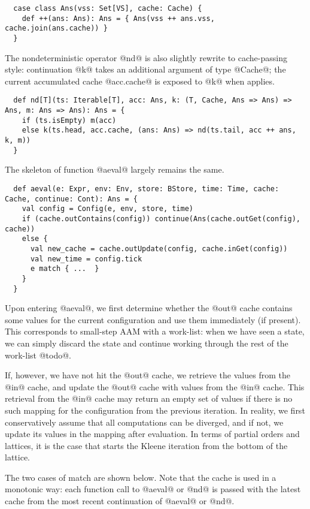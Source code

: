\documentclass[acmsmall, review]{acmart}\settopmatter{}
\begin{document}
\begin{lstlisting}
  case class Ans(vss: Set[VS], cache: Cache) {
    def ++(ans: Ans): Ans = { Ans(vss ++ ans.vss, cache.join(ans.cache)) }
  }
\end{lstlisting}

The nondeterministic operator @nd@ is also slightly rewrite to cache-passing style:
continuation @k@ takes an additional argument of type @Cache@; the current accumulated
cache @acc.cache@ is exposed to @k@ when applies.

\begin{lstlisting}
  def nd[T](ts: Iterable[T], acc: Ans, k: (T, Cache, Ans => Ans) => Ans, m: Ans => Ans): Ans = {
    if (ts.isEmpty) m(acc)
    else k(ts.head, acc.cache, (ans: Ans) => nd(ts.tail, acc ++ ans, k, m))
  }
\end{lstlisting}

The skeleton of function @aeval@ largely remains the same. 

\begin{lstlisting}
  def aeval(e: Expr, env: Env, store: BStore, time: Time, cache: Cache, continue: Cont): Ans = {
    val config = Config(e, env, store, time)
    if (cache.outContains(config)) continue(Ans(cache.outGet(config), cache))
    else {
      val new_cache = cache.outUpdate(config, cache.inGet(config))
      val new_time = config.tick 
      e match { ...  }
    }
  }
\end{lstlisting}

Upon entering @aeval@, we first determine whether the @out@ cache
contains some values for the current configuration and use them immediately (if present).
This corresponds to small-step AAM with a work-list: when we have seen a state,
we can simply discard the state and continue working through the rest of the work-list @todo@.

If, however, we have not hit the @out@ cache, we retrieve the values from the @in@ cache, 
and update the @out@ cache with values from the @in@ cache. This retrieval from the @in@ 
cache may return an empty set of values if there is no such mapping for the configuration 
from the previous iteration.
In reality, we first conservatively assume that all computations can be diverged, and if 
not, we update its values in the mapping after evaluation. In terms of partial orders and 
lattices, it is the case that starts the Kleene iteration from the bottom of the lattice.

The two cases of match are shown below. Note that the cache is used in a monotonic way: 
each function call to @aeval@ or @nd@ is passed with the latest cache from the most recent 
continuation of @aeval@ or @nd@.
\end{document}
